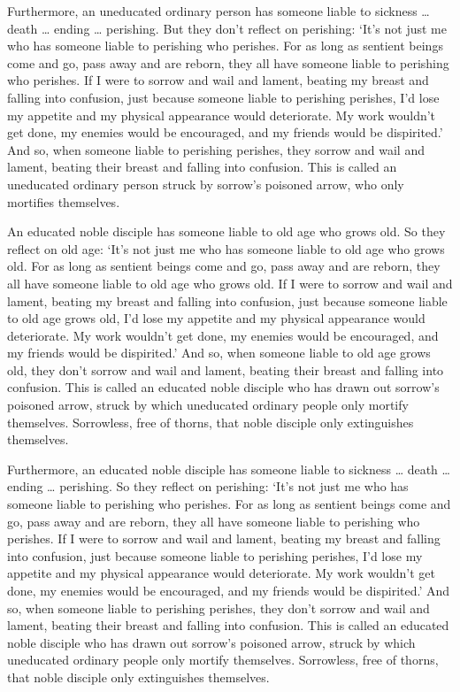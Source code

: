 \documentclass[12pt,openany]{book}%
\begin{document}
Furthermore, an uneducated ordinary person has someone liable to sickness … death … ending … perishing. But they don’t reflect on perishing: ‘It’s not just me who has someone liable to perishing who perishes. For as long as sentient beings come and go, pass away and are reborn, they all have someone liable to perishing who perishes. If I were to sorrow and wail and lament, beating my breast and falling into confusion, just because someone liable to perishing perishes, I’d lose my appetite and my physical appearance would deteriorate. My work wouldn’t get done, my enemies would be encouraged, and my friends would be dispirited.’ And so, when someone liable to perishing perishes, they sorrow and wail and lament, beating their breast and falling into confusion. This is called an uneducated ordinary person struck by sorrow’s poisoned arrow, who only mortifies themselves. 

An educated noble disciple has someone liable to old age who grows old. So they reflect on old age: ‘It’s not just me who has someone liable to old age who grows old. For as long as sentient beings come and go, pass away and are reborn, they all have someone liable to old age who grows old. If I were to sorrow and wail and lament, beating my breast and falling into confusion, just because someone liable to old age grows old, I’d lose my appetite and my physical appearance would deteriorate. My work wouldn’t get done, my enemies would be encouraged, and my friends would be dispirited.’ And so, when someone liable to old age grows old, they don’t sorrow and wail and lament, beating their breast and falling into confusion. This is called an educated noble disciple who has drawn out sorrow’s poisoned arrow, struck by which uneducated ordinary people only mortify themselves. Sorrowless, free of thorns, that noble disciple only extinguishes themselves. 

Furthermore, an educated noble disciple has someone liable to sickness … death … ending … perishing. So they reflect on perishing: ‘It’s not just me who has someone liable to perishing who perishes. For as long as sentient beings come and go, pass away and are reborn, they all have someone liable to perishing who perishes. If I were to sorrow and wail and lament, beating my breast and falling into confusion, just because someone liable to perishing perishes, I’d lose my appetite and my physical appearance would deteriorate. My work wouldn’t get done, my enemies would be encouraged, and my friends would be dispirited.’ And so, when someone liable to perishing perishes, they don’t sorrow and wail and lament, beating their breast and falling into confusion. This is called an educated noble disciple who has drawn out sorrow’s poisoned arrow, struck by which uneducated ordinary people only mortify themselves. Sorrowless, free of thorns, that noble disciple only extinguishes themselves. 
\end{document}

